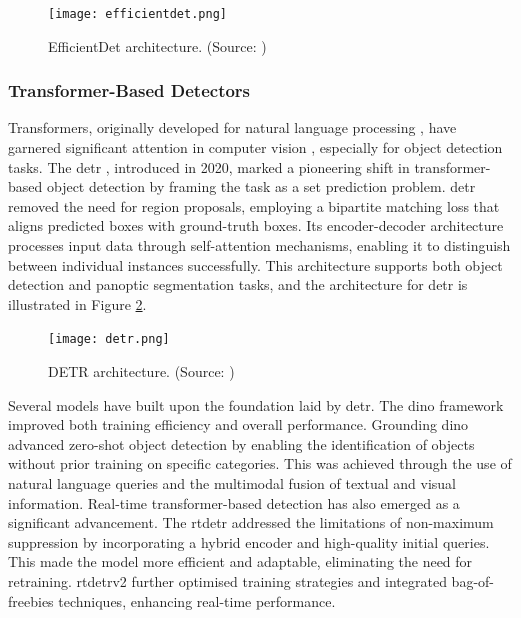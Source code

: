 \begin{figure}[!htbp]
\centering
\texttt{[image: efficientdet.png]}
\caption{EfficientDet architecture. (Source: \cite{efficientdet})}
\label{fig:efficientdet}
\end{figure}

\subsubsection{Transformer-Based Detectors}
\label{subsubsec:2_transformers}

Transformers, originally developed for natural language processing \cite{transformers}, have garnered significant attention in computer vision \cite{visiontransformer}, especially for object detection tasks. The \gls{detr} \cite{detr}, introduced in 2020, marked a pioneering shift in transformer-based object detection by framing the task as a set prediction problem. \gls{detr} removed the need for region proposals, employing a bipartite matching loss that aligns predicted boxes with ground-truth boxes. Its encoder-decoder architecture processes input data through self-attention mechanisms, enabling it to distinguish between individual instances successfully. This architecture supports both object detection and panoptic segmentation tasks, and the architecture for \gls{detr} is illustrated in Figure \ref{fig:detr}.

\begin{figure}[ht]
    \centering
    \texttt{[image: detr.png]}
    \caption{DETR architecture. (Source: \cite{detr})}
    \label{fig:detr}
\end{figure}

Several models have built upon the foundation laid by \gls{detr}. The \gls{dino} framework \cite{zhang2022dino, li2022dn, liu2022dabdetr} improved both training efficiency and overall performance. Grounding \gls{dino} \cite{groundingdino} advanced zero-shot object detection by enabling the identification of objects without prior training on specific categories. This was achieved through the use of natural language queries and the multimodal fusion of textual and visual information.
Real-time transformer-based detection has also emerged as a significant advancement. The \gls{rtdetr} \cite{rt-detr} addressed the limitations of non-maximum suppression by incorporating a hybrid encoder and high-quality initial queries. This made the model more efficient and adaptable, eliminating the need for retraining. \gls{rtdetr}v2 \cite{rt-detrv2} further optimised training strategies and integrated bag-of-freebies techniques, enhancing real-time performance.

